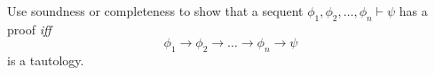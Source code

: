Use soundness or completeness to show that a sequent $\phi_1,\phi_2,\ldots,\phi_n \vdash \psi$ 
has a proof \textit{iff}
$$\phi_1\rightarrow\phi_2\rightarrow\ldots\rightarrow\phi_n\rightarrow\psi$$
is a tautology.